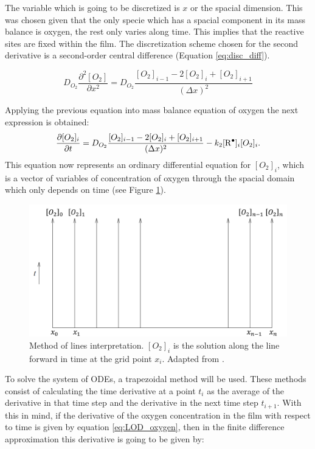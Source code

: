 \documentclass[twoside,11pt]{report}
\begin{document}
The variable which is going to be discretized is $x$ or the spacial dimension. This was chosen given that the only specie which has a spacial component in its mass balance is oxygen, the rest only varies along time. This implies that the reactive sites are fixed within the film. The discretization scheme chosen for the second derivative is a second-order central difference  (Equation \ref{eq:disc_diff}). 

\begin{equation}
    D_{O_2}\frac{\partial^2 [O_2]}{\partial x^2}= D_{O_2} \frac{[O_2]_{i-1}-2[O_2]_{i}+[O_2]_{i+1}}{(\Delta x)^2}
    \label{eq:disc_diff}
\end{equation}

Applying the previous equation into mass balance equation of oxygen the next expression is obtained:
\begin{equation}
     \frac{\partial [O_2]_i}{\partial t}=  D_{O_2} \frac{[O_2]_{i-1}-2[O_2]_{i}+[O_2]_{i+1}}{(\Delta x)^2} -k_2[\ce{R^.}]_i[O_2]_i.
     \label{eq:LOD_oxygen}
\end{equation}
This equation now represents an ordinary differential equation for $[O_2]_i$, which is a vector of variables of concentration of oxygen through the spacial domain which only depends on time (see Figure \ref{fig:LOD_diagram}).

\begin{figure}[ht]
    \centering
    \includegraphics[width=0.7 \linewidth]{Documento_Latex/Imagenes/LOD.png}
    \caption{Method of lines interpretation. $[O_2]_i$ is the solution along the line forward in time at the grid point $x_i$. Adapted from \cite{LeVeque2007FiniteProblems}.}
    \label{fig:LOD_diagram}
\end{figure}

To solve the system of ODEs, a trapezoidal method will be used. These methods consist of calculating the time derivative at a point $t_i$ as the average of the derivative in that time step and the derivative in the next time step $t_{i+1}$. With this in mind, if the derivative of the oxygen concentration in the film with respect to time is given by equation \ref{eq:LOD_oxygen}, then in the finite difference approximation this derivative is going to be given by:
\end{document}

